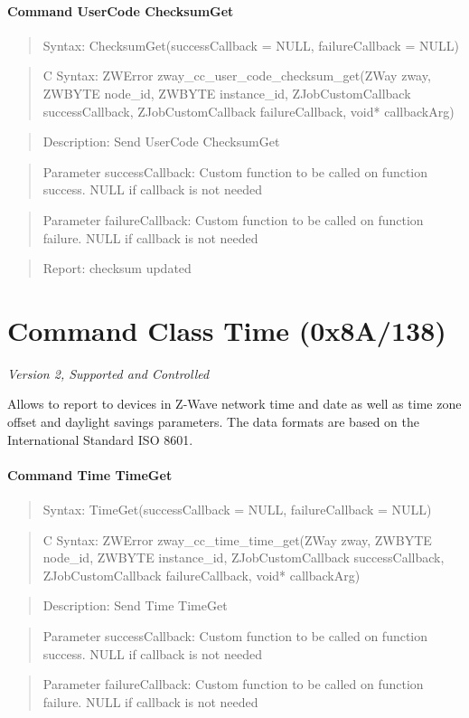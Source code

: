 \paragraph{Command UserCode ChecksumGet}
\begin{quote}Syntax: ChecksumGet(successCallback = NULL, failureCallback = NULL)\end{quote}
\begin{quote}C Syntax: ZWError zway\_cc\_user\_code\_checksum\_get(ZWay zway, ZWBYTE node\_id, ZWBYTE instance\_id, ZJobCustomCallback successCallback, ZJobCustomCallback failureCallback, void* callbackArg)\end{quote}
\begin{quote}Description: Send UserCode ChecksumGet\end{quote}
\begin{quote}Parameter successCallback: Custom function to be called on function success. NULL if callback is not needed\end{quote}
\begin{quote}Parameter failureCallback: Custom function to be called on function failure. NULL if callback is not needed\end{quote}
\begin{quote}Report: checksum updated\end{quote}


\section{Command Class Time (0x8A/138)}

\textit{Version 2, Supported and Controlled}
\newline

Allows to report to devices in Z-Wave network time and date as well as time zone offset and daylight savings parameters. The data formats are based on the International Standard ISO 8601.
\paragraph{Command Time TimeGet}
\begin{quote}Syntax: TimeGet(successCallback = NULL, failureCallback = NULL)\end{quote}
\begin{quote}C Syntax: ZWError zway\_cc\_time\_time\_get(ZWay zway, ZWBYTE node\_id, ZWBYTE instance\_id, ZJobCustomCallback successCallback, ZJobCustomCallback failureCallback, void* callbackArg)\end{quote}
\begin{quote}Description: Send Time TimeGet\end{quote}
\begin{quote}Parameter successCallback: Custom function to be called on function success. NULL if callback is not needed\end{quote}
\begin{quote}Parameter failureCallback: Custom function to be called on function failure. NULL if callback is not needed\end{quote}


